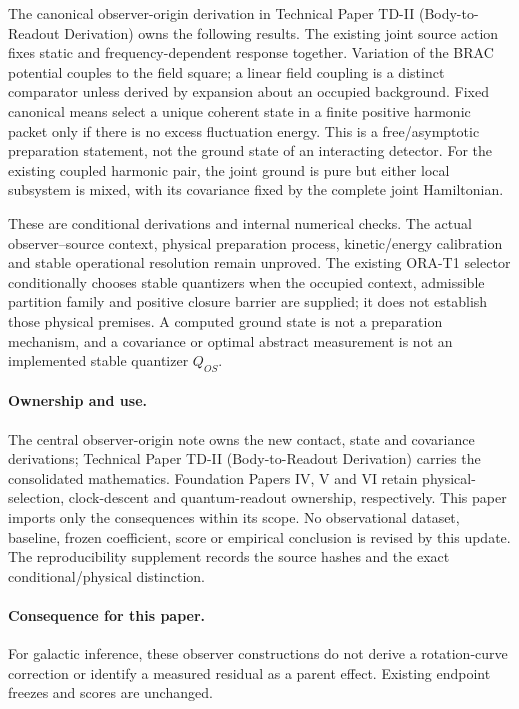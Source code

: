 \documentclass[11pt]{article}
\begin{document}
The canonical observer-origin derivation in Technical Paper TD-II
(Body-to-Readout Derivation) owns the following
results. The existing joint source action fixes static and frequency-dependent
response together. Variation of the BRAC potential couples to the field
square; a linear field coupling is a distinct comparator unless derived by
expansion about an occupied background. Fixed canonical means select a unique
coherent state in a finite positive harmonic packet only if there is no excess
fluctuation energy. This is a free/asymptotic preparation statement, not the
ground state of an interacting detector. For the existing coupled harmonic
pair, the joint ground is pure but either local subsystem is mixed, with its
covariance fixed by the complete joint Hamiltonian.

These are conditional derivations and internal numerical checks. The actual
observer--source context, physical preparation process, kinetic/energy
calibration and stable operational resolution remain unproved. The existing
ORA-T1 selector conditionally chooses stable quantizers when the occupied
context, admissible partition family and positive closure barrier are supplied;
it does not establish those physical premises. A computed ground state is not
a preparation mechanism, and a covariance or optimal abstract measurement is
not an implemented stable quantizer $Q_{OS}$.

\paragraph{Ownership and use.}
The central observer-origin note owns the new contact, state and covariance
derivations; Technical Paper TD-II (Body-to-Readout Derivation) carries the consolidated
mathematics. Foundation Papers IV, V and VI retain physical-selection,
clock-descent and quantum-readout ownership, respectively. This paper imports
only the consequences within its scope. No observational dataset, baseline,
frozen coefficient, score or empirical conclusion is revised by this update.
The reproducibility supplement records the source hashes and the exact
conditional/physical distinction.

\paragraph{Consequence for this paper.}
For galactic inference, these observer constructions do not derive a rotation-curve correction or identify a measured residual as a parent effect. Existing endpoint freezes and scores are unchanged.
\end{document}
